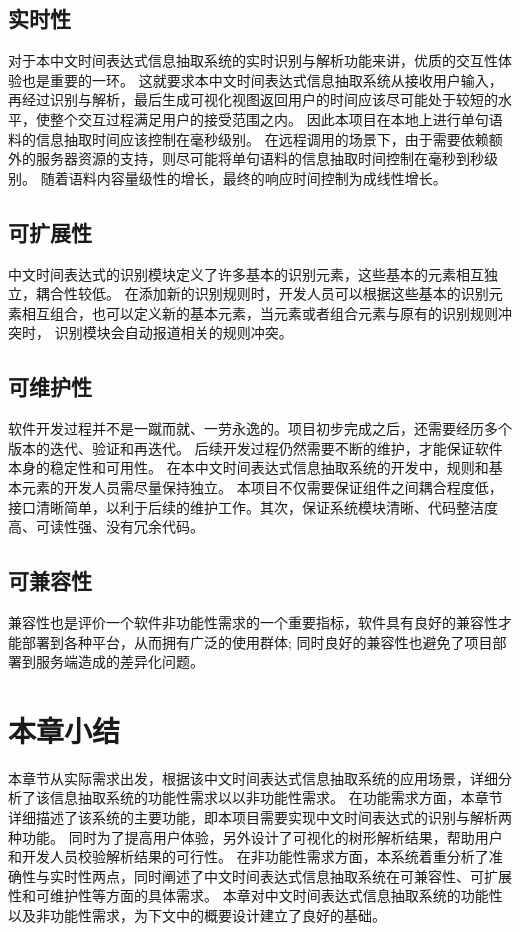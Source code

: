 \subsection{实时性}

对于本中文时间表达式信息抽取系统的实时识别与解析功能来讲，优质的交互性体验也是重要的一环。
这就要求本中文时间表达式信息抽取系统从接收用户输入，再经过识别与解析，最后生成可视化视图返回用户的时间应该尽可能处于较短的水平，使整个交互过程满足用户的接受范围之内。
因此本项目在本地上进行单句语料的信息抽取时间应该控制在毫秒级别。
在远程调用的场景下，由于需要依赖额外的服务器资源的支持，则尽可能将单句语料的信息抽取时间控制在毫秒到秒级别。
随着语料内容量级性的增长，最终的响应时间控制为成线性增长。

\subsection{可扩展性}

中文时间表达式的识别模块定义了许多基本的识别元素，这些基本的元素相互独立，耦合性较低。
在添加新的识别规则时，开发人员可以根据这些基本的识别元素相互组合，也可以定义新的基本元素，当元素或者组合元素与原有的识别规则冲突时，
识别模块会自动报道相关的规则冲突。

\subsection{可维护性}

软件开发过程并不是一蹴而就、一劳永逸的。项目初步完成之后，还需要经历多个版本的迭代、验证和再迭代。
后续开发过程仍然需要不断的维护，才能保证软件本身的稳定性和可用性。
在本中文时间表达式信息抽取系统的开发中，规则和基本元素的开发人员需尽量保持独立。
本项目不仅需要保证组件之间耦合程度低，接口清晰简单，以利于后续的维护工作。其次，保证系统模块清晰、代码整洁度高、可读性强、没有冗余代码。

\subsection{可兼容性}

兼容性也是评价一个软件非功能性需求的一个重要指标，软件具有良好的兼容性才能部署到各种平台，从而拥有广泛的使用群体; 同时良好的兼容性也避免了项目部署到服务端造成的差异化问题。

\section{本章小结}

本章节从实际需求出发，根据该中文时间表达式信息抽取系统的应用场景，详细分析了该信息抽取系统的功能性需求以以非功能性需求。
在功能需求方面，本章节详细描述了该系统的主要功能，即本项目需要实现中文时间表达式的识别与解析两种功能。
同时为了提高用户体验，另外设计了可视化的树形解析结果，帮助用户和开发人员校验解析结果的可行性。
在非功能性需求方面，本系统着重分析了准确性与实时性两点，同时阐述了中文时间表达式信息抽取系统在可兼容性、可扩展性和可维护性等方面的具体需求。
本章对中文时间表达式信息抽取系统的功能性以及非功能性需求，为下文中的概要设计建立了良好的基础。
